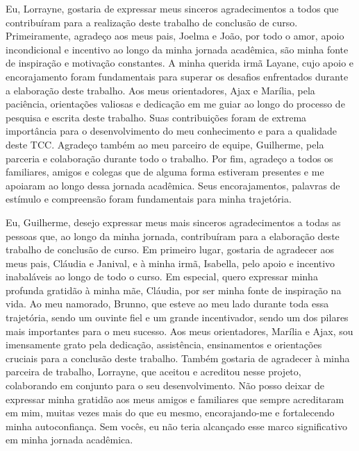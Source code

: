 \begin{agradecimentos}


Eu, Lorrayne, gostaria de expressar meus sinceros agradecimentos a todos que contribuíram para a realização deste trabalho de conclusão de curso. Primeiramente, agradeço aos meus pais, Joelma e João, por todo o amor, apoio incondicional e incentivo ao longo da minha jornada acadêmica, são minha fonte de inspiração e motivação constantes. A minha querida irmã Layane, cujo apoio e encorajamento foram fundamentais para superar os desafios enfrentados durante a elaboração deste trabalho. Aos meus orientadores, Ajax e Marília, pela paciência, orientações valiosas e dedicação em me guiar ao longo do processo de pesquisa e escrita deste trabalho. Suas contribuições foram de extrema importância para o desenvolvimento do meu conhecimento e para a qualidade deste TCC. Agradeço também ao meu parceiro de equipe, Guilherme, pela parceria e colaboração durante todo o trabalho. Por fim, agradeço a todos os familiares, amigos e colegas que de alguma forma estiveram presentes e me apoiaram ao longo dessa jornada acadêmica. Seus encorajamentos, palavras de estímulo e compreensão foram fundamentais para minha trajetória.

Eu, Guilherme, desejo expressar meus mais sinceros agradecimentos a todas as pessoas que, ao longo da minha jornada, contribuíram para a elaboração deste trabalho de conclusão de curso. Em primeiro lugar, gostaria de agradecer aos meus pais, Cláudia e Janival, e à minha irmã, Isabella, pelo apoio e incentivo inabaláveis ao longo de todo o curso. Em especial, quero expressar minha profunda gratidão à minha mãe, Cláudia, por ser minha fonte de inspiração na vida. Ao meu namorado, Brunno, que esteve ao meu lado durante toda essa trajetória, sendo um ouvinte fiel e um grande incentivador, sendo um dos pilares mais importantes para o meu sucesso. Aos meus orientadores, Marília e Ajax, sou imensamente grato pela dedicação, assistência, ensinamentos e orientações cruciais para a conclusão deste trabalho. Também gostaria de agradecer à minha parceira de trabalho, Lorrayne, que aceitou e acreditou nesse projeto, colaborando em conjunto para o seu desenvolvimento. Não posso deixar de expressar minha gratidão aos meus amigos e familiares que sempre acreditaram em mim, muitas vezes mais do que eu mesmo, encorajando-me e fortalecendo minha autoconfiança. Sem vocês, eu não teria alcançado esse marco significativo em minha jornada acadêmica.

\end{agradecimentos}
